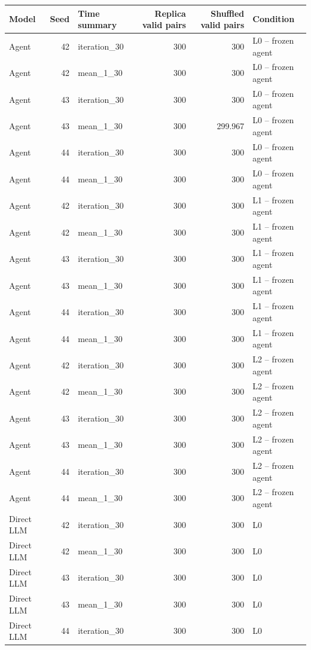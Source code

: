 \begin{table}[htbp!]
\centering
\small
\setlength{\tabcolsep}{3pt}
\renewcommand{\arraystretch}{1.1}
\begin{tabular}{lrlrrl}
\hline
Model & Seed & Time summary & Replica valid pairs & Shuffled valid pairs & Condition \\
\hline
Agent & 42 & iteration\_30 & 300 & 300 & L0 -- frozen agent \\
Agent & 42 & mean\_1\_30 & 300 & 300 & L0 -- frozen agent \\
Agent & 43 & iteration\_30 & 300 & 300 & L0 -- frozen agent \\
Agent & 43 & mean\_1\_30 & 300 & 299.967 & L0 -- frozen agent \\
Agent & 44 & iteration\_30 & 300 & 300 & L0 -- frozen agent \\
Agent & 44 & mean\_1\_30 & 300 & 300 & L0 -- frozen agent \\
Agent & 42 & iteration\_30 & 300 & 300 & L1 -- frozen agent \\
Agent & 42 & mean\_1\_30 & 300 & 300 & L1 -- frozen agent \\
Agent & 43 & iteration\_30 & 300 & 300 & L1 -- frozen agent \\
Agent & 43 & mean\_1\_30 & 300 & 300 & L1 -- frozen agent \\
Agent & 44 & iteration\_30 & 300 & 300 & L1 -- frozen agent \\
Agent & 44 & mean\_1\_30 & 300 & 300 & L1 -- frozen agent \\
Agent & 42 & iteration\_30 & 300 & 300 & L2 -- frozen agent \\
Agent & 42 & mean\_1\_30 & 300 & 300 & L2 -- frozen agent \\
Agent & 43 & iteration\_30 & 300 & 300 & L2 -- frozen agent \\
Agent & 43 & mean\_1\_30 & 300 & 300 & L2 -- frozen agent \\
Agent & 44 & iteration\_30 & 300 & 300 & L2 -- frozen agent \\
Agent & 44 & mean\_1\_30 & 300 & 300 & L2 -- frozen agent \\
Direct LLM & 42 & iteration\_30 & 300 & 300 & L0 \\
Direct LLM & 42 & mean\_1\_30 & 300 & 300 & L0 \\
Direct LLM & 43 & iteration\_30 & 300 & 300 & L0 \\
Direct LLM & 43 & mean\_1\_30 & 300 & 300 & L0 \\
Direct LLM & 44 & iteration\_30 & 300 & 300 & L0 \\

\end{tabular}
\end{table}
